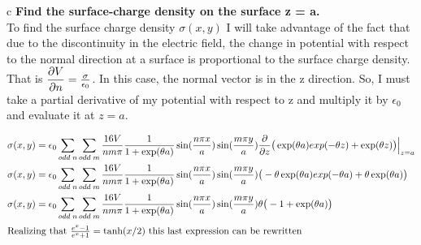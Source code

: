 \begin{homeworkProblem}[Jackson 3rd ed. : 2.23]
\begin{homeworkSection}{c}
\textbf{Find the surface-charge density on the surface z = a.} \\
To find the surface charge density $\sigma(x,y)$ I will take advantage of the fact that due to the discontinuity in the electric field, the change in potential with respect to the normal direction at a surface is proportional to the surface charge density. That is $\dfrac{\partial V}{\partial n} = \frac{\sigma}{\epsilon_0}$. In this case, the normal vector is in the z direction. So, I must take a partial derivative of my potential with respect to z and multiply it by $\epsilon_0$ and evaluate it at $z=a$.
\begin{center}
\begin{align}
\sigma(x,y) &= \epsilon_0 \sum\limits_{odd\;n} \sum\limits_{odd\;m} \frac{16 V}{n m \pi} \frac{1}{1+\exp(\theta a)} \sin(\frac{n \pi x}{a}) \sin(\frac{m \pi y}{a}) \dfrac{\partial }{\partial z}\big(\exp(\theta a)exp(-\theta z) + \exp(\theta z)\big)\Big|_{z=a} \nonumber \\
\sigma(x,y) &= \epsilon_0 \sum\limits_{odd\;n} \sum\limits_{odd\;m} \frac{16 V}{n m \pi} \frac{1}{1+\exp(\theta a)} \sin(\frac{n \pi x}{a}) \sin(\frac{m \pi y}{a}) \big(-\theta \exp(\theta a)exp(-\theta a) + \theta \exp(\theta a)\big) \nonumber \\
\sigma(x,y) &= \epsilon_0 \sum\limits_{odd\;n} \sum\limits_{odd\;m} \frac{16 V}{n m \pi} \frac{1}{1+\exp(\theta a)} \sin(\frac{n \pi x}{a}) \sin(\frac{m \pi y}{a}) \theta\big(-1 + \exp(\theta a)\big) \nonumber \\
\intertext{Realizing that $\frac{e^x-1}{e^x+1} = \tanh(x/2)$ this last expression can be rewritten} \nonumber
\end{align}
\end{center}

\problemAnswer{
\[
\sigma(x,y) = \epsilon_0 \sum\limits_{odd\;n} \sum\limits_{odd\;m} \frac{16 V}{n m \pi} \sin(\frac{n \pi x}{a}) \sin(\frac{m \pi y}{a})\tanh(\theta a/2) \theta \nonumber
\]
}

\end{homeworkSection}

\end{homeworkProblem}
